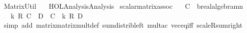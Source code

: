 %
\begin{isabellebody}%
%
%
\isadelimtheory
%
\endisadelimtheory
%
\isatagtheory
{}\isamarkupfalse%
\ Matrix{\isacharunderscore}{\kern0pt}Util\isanewline
\ \ \ {\isachardoublequoteopen}HOL{\isacharminus}{\kern0pt}Analysis{\isachardot}{\kern0pt}Analysis{\isachardoublequoteclose}\isanewline
{}%
\endisatagtheory
{\isafoldtheory}%
%
\isadelimtheory
%
\endisadelimtheory
%
\isadelimdocument
%
\endisadelimdocument
%
\isatagdocument
%
\isamarkuptrue%
%
\endisatagdocument
{\isafolddocument}%
%
\isadelimdocument
%
\endisadelimdocument
{}\isamarkupfalse%
\ scalar{\isacharunderscore}{\kern0pt}matrix{\isacharunderscore}{\kern0pt}assoc{\isacharprime}{\kern0pt}{\isacharcolon}{\kern0pt}\isanewline
\ \ \ C\ {\isacharcolon}{\kern0pt}{\isacharcolon}{\kern0pt}\ {\isachardoublequoteopen}{\isacharparenleft}{\kern0pt}{\isacharprime}{\kern0pt}b{\isacharcolon}{\kern0pt}{\isacharcolon}{\kern0pt}real{\isacharunderscore}{\kern0pt}algebra{\isacharunderscore}{\kern0pt}{}{\isacharparenright}{\kern0pt}{\isacharcircum}{\kern0pt}{\isacharprime}{\kern0pt}m{\isacharcircum}{\kern0pt}{\isacharprime}{\kern0pt}n{\isachardoublequoteclose}\isanewline
\ \ \ {\isachardoublequoteopen}k\ {\isacharasterisk}{\kern0pt}\isactrlsub R\ {\isacharparenleft}{\kern0pt}C\ {\isacharasterisk}{\kern0pt}{\isacharasterisk}{\kern0pt}\ D{\isacharparenright}{\kern0pt}\ {\isacharequal}{\kern0pt}\ C\ {\isacharasterisk}{\kern0pt}{\isacharasterisk}{\kern0pt}\ {\isacharparenleft}{\kern0pt}k\ {\isacharasterisk}{\kern0pt}\isactrlsub R\ D{\isacharparenright}{\kern0pt}{\isachardoublequoteclose}\isanewline
%
\isadelimproof
\ \ %
\endisadelimproof
%
\isatagproof
{}\isamarkupfalse%
\ {\isacharparenleft}{\kern0pt}simp\ add{\isacharcolon}{\kern0pt}\ matrix{\isacharunderscore}{\kern0pt}matrix{\isacharunderscore}{\kern0pt}mult{\isacharunderscore}{\kern0pt}def\ sum{\isacharunderscore}{\kern0pt}distrib{\isacharunderscore}{\kern0pt}left\ mult{\isacharunderscore}{\kern0pt}ac\ vec{\isacharunderscore}{\kern0pt}eq{\isacharunderscore}{\kern0pt}iff\ scaleR{\isacharunderscore}{\kern0pt}sum{\isacharunderscore}{\kern0pt}right{\isacharparenright}{\kern0pt}%
\endisatagproof
{\isafoldproof}%
%
\isadelimproof
%
\endisadelimproof
%
\isadelimdocument
%
\endisadelimdocument
%
\isatagdocument
%
\isamarkuptrue%
%
\endisatagdocument
{\isafolddocument}%

\end{isabellebody}
